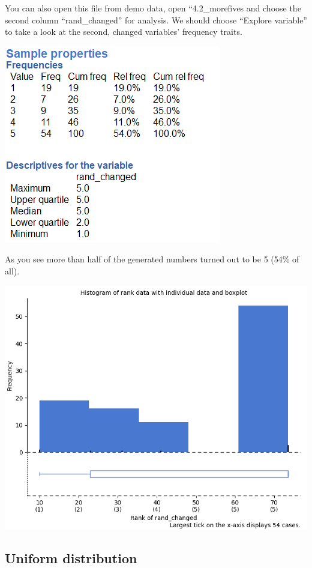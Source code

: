 \documentclass[
]{book}
\begin{document}
You can also open this file from demo data, open ``4.2\_morefives and choose the second column ``rand\_changed'' for analysis. We should choose ``Explore variable'' to take a look at the second, changed variables' frequency traits.

\includegraphics{img/ch4/morefivesfreq.png}

As you see more than half of the generated numbers turned out to be 5 (54\% of all).

\includegraphics{img/ch4/morefiveshisto.png}

\hypertarget{uniform-distribution}{%
\subsection{Uniform distribution}\label{uniform-distribution}}
\end{document}
